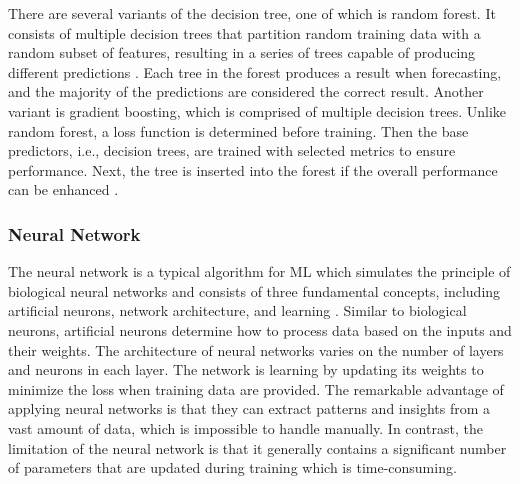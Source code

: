 \documentclass[12pt,twoside]{report}
\begin{document}
There are several variants of the decision tree, one of which is random forest. It consists of multiple decision trees that partition random training data with a random subset of features, resulting in a series of trees capable of producing different predictions \citep{RN34}. Each tree in the forest produces a result when forecasting, and the majority of the predictions are considered the correct result. Another variant is gradient boosting, which is comprised of multiple decision trees. Unlike random forest, a loss function is determined before training. Then the base predictors, i.e., decision trees, are trained with selected metrics to ensure performance. Next, the tree is inserted into the forest if the overall performance can be enhanced \citep{RN35}. 

\subsubsection{Neural Network}
The neural network is a typical algorithm for ML which simulates the principle of biological neural networks and consists of three fundamental concepts, including artificial neurons, network architecture, and learning \citep{RN36}. Similar to biological neurons, artificial neurons determine how to process data based on the inputs and their weights. The architecture of neural networks varies on the number of layers and neurons in each layer. The network is learning by updating its weights to minimize the loss when training data are provided. The remarkable advantage of applying neural networks is that they can extract patterns and insights from a vast amount of data, which is impossible to handle manually. In contrast, the limitation of the neural network is that it generally contains a significant number of parameters that are updated during training which is time-consuming. 
\end{document}
